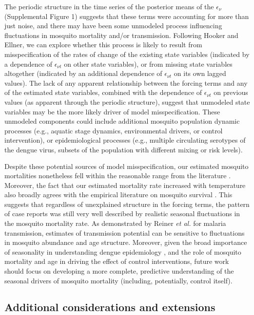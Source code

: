 \documentclass[10pt,letterpaper]{article}
\begin{document}
The periodic structure in the time series of the posterior means of the $\epsilon_{\nu}$ (Supplemental Figure 1) suggests that these terms were accounting for more than just noise, and there may have been some unmodeled process influencing fluctuations in mosquito mortality and/or transmission.
Following Hooker and Ellner, we can explore whether this process is likely to result from misspecification of the rates of change of the existing state variables (indicated by a dependence of $\epsilon_{\nu t}$ on other state variables), or from missing state variables altogether (indicated by an additional dependence of $\epsilon_{\nu t}$ on its own lagged values). 
The lack of any apparent relationship between the forcing terms and any of the estimated state variables, combined with the dependence of $\epsilon_{\nu t}$ on previous values (as apparent through the periodic structure), suggest that unmodeled state variables may be the more likely driver of model misspecification.
These unmodeled components could include additional mosquito population dynamic processes (e.g., aquatic stage dynamics, environmental drivers, or control intervention), or epidemiological processes (e.g., multiple circulating serotypes of the dengue virus, subsets of the population with different mixing or risk levels).

Despite these potential sources of model misspecification, our estimated mosquito mortalities nonetheless fell within the reasonable range from the literature \cite{Maciel-de-Freitas2008, Brady2013}.
Moreover, the fact that our estimated mortality rate increased with temperature also broadly agrees with the empirical literature on mosquito survival \cite{Yang2009, Brady2013, Morin2013}.
This suggests that regardless of unexplained structure in the forcing terms, the pattern of case reports was still very well described by realistic seasonal fluctuations in the mosquito mortality rate.
As demonstrated by Reiner \emph{et al.} \cite{Reiner2015} for malaria transmission, estimates of transmission potential can be sensitive to fluctuations in mosquito abundance and age structure.
Moreover, given the broad importance of seasonality in understanding dengue epidemiology \cite{TenBosch2016}, and the role of mosquito mortality and age in driving the effect of control interventions, future work should focus on developing a more complete, predictive understanding of the seasonal drivers of mosquito mortality (including, potentially, control itself).

\subsection*{Additional considerations and extensions}
\end{document}
